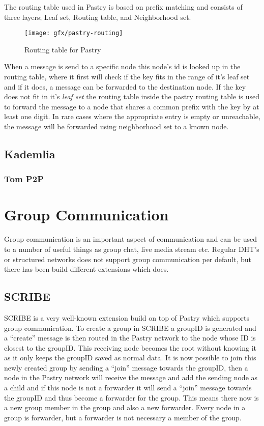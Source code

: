 The routing table used in Pastry is based on prefix matching and consists of three layers; Leaf set, Routing table, and Neighborhood set.\\
\begin{figure}[bth]
\texttt{[image: gfx/pastry-routing]}
\caption[routingtable]{Routing table for Pastry} \label{fig:pastryrouting}
\end{figure}
When a message is send to a specific node this node's id is looked up in the routing table, where it first will check if the key fits in the range of it's leaf set and if it does, a message can be forwarded to the destination node.
If the key does not fit in it's \emph{leaf set} the routing table inside the pastry routing table is used to forward the message to a node that shares a common prefix with the key by at least one digit.
In rare cases where the appropriate entry is empty or unreachable, the message will be forwarded using neighborhood set to a known node.


\subsection{Kademlia}
\subsubsection{Tom P2P}

\section{Group Communication}
Group communication is an important aspect of communication and can be used to a number of useful things as group chat, live media stream etc.
Regular DHT's or structured networks does not support group communication per default, but there has been build different extensions which does.
\subsection{SCRIBE}
SCRIBE is a very well-known extension build on top of Pastry which supports group communication. 
To create a group in SCRIBE a groupID is generated and a ``create'' message is then routed in the Pastry network to the node whose ID is closest to the groupID. This receiving node becomes the root without knowing it as it only keeps the groupID saved as normal data.
It is now possible to join this newly created group by sending a ``join'' message towards the groupID, then a node in the Pastry network will receive the message and add the sending node as a child and if this node is not a forwarder it will send a ``join'' message towards the groupID and thus become a forwarder for the group. This means there now is a new group member in the group and also a new forwarder. Every node in a group is forwarder, but a forwarder is not necessary a member of  the group.

